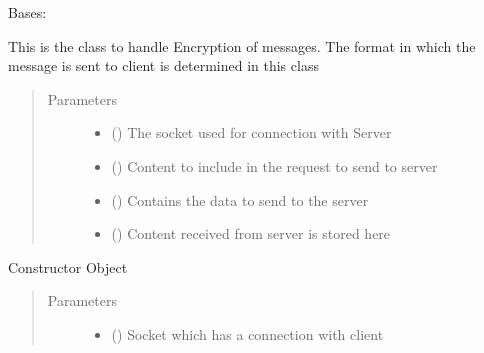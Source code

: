 \documentclass[letterpaper,10pt,english]{sphinxmanual}
\begin{document}
\begin{fulllineitems}
\label{\detokenize{Message:Message.Message}}
Bases: 

This is the class to handle Encryption of messages. The format in which the message is sent to client is determined in this class
\begin{quote}\begin{description}
\item[{Parameters}] \leavevmode\begin{itemize}
\item {} 
 () \textendash{} The socket used for connection with Server

\item {} 
 () \textendash{} Content to include in the request to send to server

\item {} 
 () \textendash{} Contains the data to send to the server

\item {} 
 () \textendash{} Content received from server is stored here

\end{itemize}

\end{description}\end{quote}

Constructor Object
\begin{quote}\begin{description}
\item[{Parameters}] \leavevmode\begin{itemize}
\item {} 
 () \textendash{} Socket which has a connection with client


\end{itemize}
\end{description}
\end{quote}
\end{fulllineitems}
\end{document}
